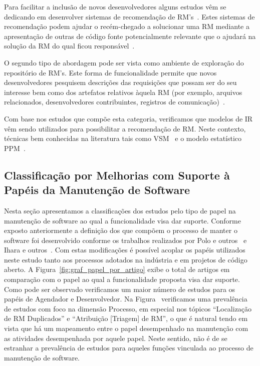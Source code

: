 Para facilitar a inclusão de novos desenvolvedores alguns estudos vêm se
dedicando em desenvolver sistemas de recomendação de
RM's~\cite{malheiros2012source, Wang2011bug}. Estes sistemas de recomendação
podem ajudar o recém-chegado a solucionar uma RM mediante a apresentação de
outras de código fonte potencialmente relevante que o ajudará na solução da RM
do qual ficou responsável~\cite{malheiros2012source}.

O segundo tipo de abordagem pode ser vista como ambiente de exploração do
repositório de RM's.  Este forma de funcionalidade permite que novos
desenvolvedores pesquisem descrições das requisições que possam ser do seu
interesse bem como dos artefatos relativos àquela RM (por exemplo, arquivos
relacionados, desenvolvedores contribuintes, registros de
comunicação)~\cite{Wang2011bug}.

Com base nos estudos que compõe esta categoria, verificamos que modelos de IR
vêm sendo utilizados para possibilitar a recomendação de RM\@. Neste contexto,
técnicas bem conhecidas na literatura tais como VSM~\cite{Wang2011bug} e o
modelo estatístico PPM~\cite{malheiros2012source}.

\subsection{Classificação por Melhorias com Suporte à Papéis da Manutenção de
	Software}
\label{sub:extensões_com_suporte_a_papeis}
Nesta seção apresentamos a classificações dos estudos pelo tipo de papel na
manutenção de software ao qual a funcionalidade visa dar suporte. Conforme
exposto anteriormente a definição dos que compõem o processo de manter o software
foi desenvolvido conforme os trabalhos realizados por Polo e
outros~\cite{Polo1999} e Ihara e outros~\cite{Ihara:2009:AMI:1595808.1595833}\@.
Com estas modificações é possível acoplar os papéis utilizados neste estudo tanto
aos processos adotados na indústria e em projetos de código aberto. A
Figura~\ref{fig:graf_papel_por_artigo} exibe o total de artigos em comparação
com o papel ao qual a funcionalidade proposta visa dar suporte. Como pode ser
observado verificamos um maior número de estudos para os papéis de Agendador e
Desenvolvedor. Na Figura~\cite{fig:grafico_topico_por_artigo} verificamos uma
prevalência de estudos com foco na dimensão Processo, em especial nos tópicos
``Localização de RM Duplicados'' e ``Atribuição [Triagem] de RM'', o que  é
natural tendo em vista que há um mapeamento entre o papel desempenhado na manutenção
com as atividades desempenhada por aquele papel. Neste sentido, não é de se
estranhar a prevalência de estudos para aqueles funções vinculada ao processo de
manutenção de software.

